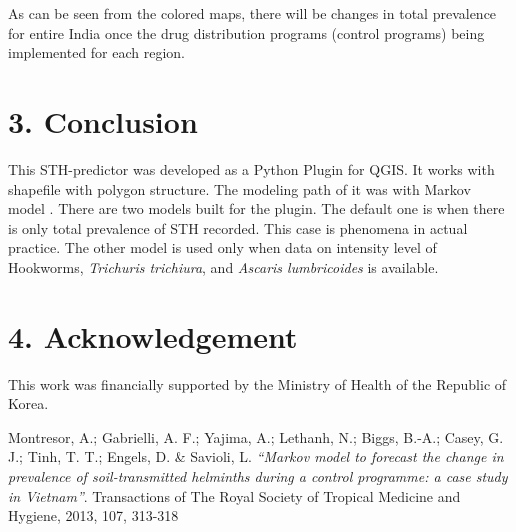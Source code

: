 \documentclass[12pt,oneside]{memoir}
\begin{document}
As can be seen from the colored maps, there will be changes in total prevalence for entire India once the drug distribution programs (control programs) being implemented for each region.

\section*{3. Conclusion}
This STH-predictor was developed as a Python Plugin for QGIS. It works with shapefile with polygon structure. The modeling path of it was with Markov model \cite{Montresor2013}. There are two models built for the plugin. The default one is when there is only total prevalence of STH recorded. This case is phenomena in actual practice. The other model is used only when data on intensity level of Hookworms, \textit{Trichuris trichiura}, and \textit{Ascaris lumbricoides} is available. 

\section*{4. Acknowledgement}
This work was financially supported by the Ministry of Health of the Republic of Korea.

\begin{thebibliography}{9}
Montresor, A.; Gabrielli, A. F.; Yajima, A.; Lethanh, N.; Biggs, B.-A.; Casey, G. J.; Tinh, T. T.; Engels, D. \& Savioli, L. \textit{``Markov model to forecast the change in prevalence of soil-transmitted helminths during a control programme: a case study in Vietnam''}. Transactions of The Royal Society of Tropical Medicine and Hygiene, 2013, 107, 313-318
\end{thebibliography}
\end{document}
